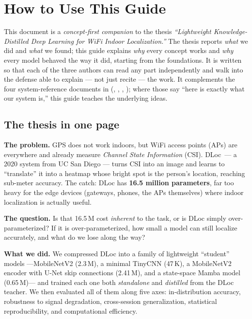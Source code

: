 \chapter*{How to Use This Guide}

This document is a \emph{concept-first companion} to the thesis \emph{``Lightweight
Knowledge-Distilled Deep Learning for WiFi Indoor Localization.''} The thesis reports \emph{what} we
did and \emph{what} we found; this guide explains \emph{why} every concept works and \emph{why} every
model behaved the way it did, starting from the foundations. It is written so that each of the three
authors can read any part independently and walk into the defense able to explain --- not just recite
--- the work. It complements the four system-reference documents in 
(, , ,
); where those say ``here is exactly what our system is,'' this guide teaches
the underlying ideas.

\section*{The thesis in one page}

\textbf{The problem.} GPS does not work indoors, but WiFi access points (APs) are everywhere and
already measure \emph{Channel State Information} (CSI). DLoc~--- a 2020 system from UC San Diego ---
turns CSI into an image and learns to ``translate'' it into a heatmap whose bright spot is the
person's location, reaching sub-meter accuracy. The catch: DLoc has \textbf{16.5 million parameters},
far too heavy for the edge devices (gateways, phones, the APs themselves) where indoor localization
is actually useful.

\textbf{The question.} Is that 16.5\,M cost \emph{inherent} to the task, or is DLoc simply
over-parameterized? If it is over-parameterized, how small a model can still localize accurately, and
what do we lose along the way?

\textbf{What we did.} We compressed DLoc into a family of lightweight ``student'' models
---MobileNetV2 (2.3\,M), a minimal TinyCNN (47\,K), a MobileNetV2 encoder with U-Net skip connections
(2.41\,M), and a state-space Mamba model (0.65\,M)--- and trained each one both \emph{standalone} and
\emph{distilled} from the DLoc teacher. We then evaluated all of them along five axes: in-distribution
accuracy, robustness to signal degradation, cross-session generalization, statistical reproducibility,
and computational efficiency.

